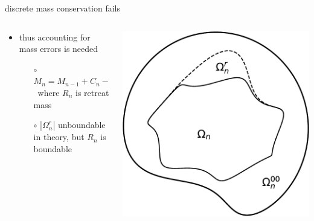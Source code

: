 \documentclass[10pt,hyperref,dvipsnames]{beamer}
\begin{document}
\begin{frame}{discrete mass conservation fails}
\begin{columns}
\begin{column}{0.7\textwidth}
\begin{itemize}
\medskip
\item thus accounting for mass errors is needed
    \begin{itemize}
    \item[$\circ$] $M_n = M_{n-1} + C_n - R_n$\, where $R_n$ is retreat mass
    \item[$\circ$] $|\Omega_n^r|$ unboundable in theory, but $R_n$ is boundable
    \end{itemize}
\end{itemize}
\end{column}
\begin{column}{0.3\textwidth}
\includegraphics[width=\textwidth]{figs/domains-fig.pdf}
\end{column}
\end{columns}
\end{frame}
\end{document}
